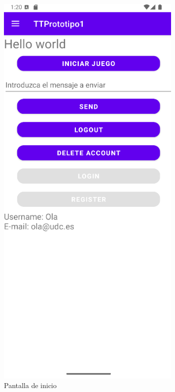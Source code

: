\documentclass[a4paper,openright,12pt]{article}
\begin{document}
\begin{figure}[htp]
\begin{minipage}{0.3\textwidth}
        \centering
        \includegraphics[width=0.8\textwidth]{Images/Vista_It3.png} 
        \caption{Pantalla de inicio}
        \label{fig:Pantalla de inicio}
    \end{minipage}
    \hfill
    \begin{minipage}{0.3\textwidth}
        \centering

\end{minipage}
\end{figure}
\end{document}
